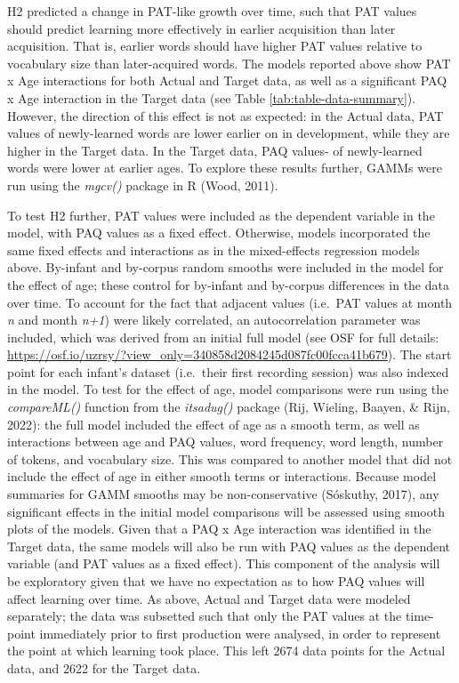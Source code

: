 \documentclass[
  man,mask,floatsintext]{apa6}
\begin{document}
H2 predicted a change in PAT-like growth over time, such that PAT values should predict learning more effectively in earlier acquisition than later acquisition. That is, earlier words should have higher PAT values relative to vocabulary size than later-acquired words. The models reported above show PAT x Age interactions for both Actual and Target data, as well as a significant PAQ x Age interaction in the Target data (see Table \ref{tab:table-data-summary}). However, the direction of this effect is not as expected: in the Actual data, PAT values of newly-learned words are lower earlier on in development, while they are higher in the Target data. In the Target data, PAQ values- of newly-learned words were lower at earlier ages. To explore these results further, GAMMs were run using the \emph{mgcv()} package in R (Wood, 2011).

To test H2 further, PAT values were included as the dependent variable in the model, with PAQ values as a fixed effect. Otherwise, models incorporated the same fixed effects and interactions as in the mixed-effects regression models above. By-infant and by-corpus random smooths were included in the model for the effect of age; these control for by-infant and by-corpus differences in the data over time. To account for the fact that adjacent values (i.e.~PAT values at month \emph{n} and month \emph{n+1}) were likely correlated, an autocorrelation parameter was included, which was derived from an initial full model (see OSF for full details: \url{https://osf.io/uzrsy/?view_only=340858d2084245d087fc00fcca41b679}). The start point for each infant's dataset (i.e.~their first recording session) was also indexed in the model. To test for the effect of age, model comparisons were run using the \emph{compareML()} function from the \emph{itsadug()} package (Rij, Wieling, Baayen, \& Rijn, 2022): the full model included the effect of age as a smooth term, as well as interactions between age and PAQ values, word frequency, word length, number of tokens, and vocabulary size. This was compared to another model that did not include the effect of age in either smooth terms or interactions. Because model summaries for GAMM smooths may be non-conservative (Sóskuthy, 2017), any significant effects in the initial model comparisons will be assessed using smooth plots of the models. Given that a PAQ x Age interaction was identified in the Target data, the same models will also be run with PAQ values as the dependent variable (and PAT values as a fixed effect). This component of the analysis will be exploratory given that we have no expectation as to how PAQ values will affect learning over time. As above, Actual and Target data were modeled separately; the data was subsetted such that only the PAT values at the time-point immediately prior to first production were analysed, in order to represent the point at which learning took place. This left 2674 data points for the Actual data, and 2622 for the Target data.
\end{document}

